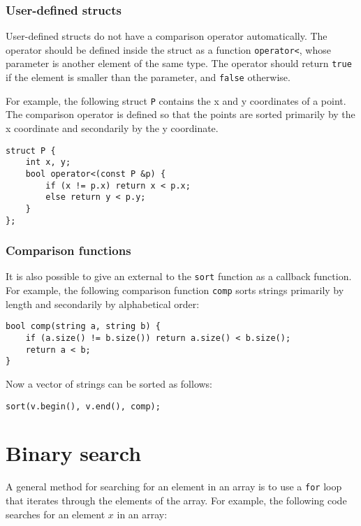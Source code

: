 \subsubsection{User-defined structs}

User-defined structs do not have a comparison
operator automatically.
The operator should be defined inside
the struct as a function
\texttt{operator<},
whose parameter is another element of the same type.
The operator should return \texttt{true}
if the element is smaller than the parameter,
and \texttt{false} otherwise.

For example, the following struct \texttt{P}
contains the x and y coordinates of a point.
The comparison operator is defined so that
the points are sorted primarily by the x coordinate
and secondarily by the y coordinate.

\begin{lstlisting}
struct P {
    int x, y;
    bool operator<(const P &p) {
        if (x != p.x) return x < p.x;
        else return y < p.y;
    }
};
\end{lstlisting}

\subsubsection{Comparison functions}


It is also possible to give an external
 to the \texttt{sort} function
as a callback function.
For example, the following comparison function \texttt{comp}
sorts strings primarily by length and secondarily
by alphabetical order:

\begin{lstlisting}
bool comp(string a, string b) {
    if (a.size() != b.size()) return a.size() < b.size();
    return a < b;
}
\end{lstlisting}
Now a vector of strings can be sorted as follows:
\begin{lstlisting}
sort(v.begin(), v.end(), comp);
\end{lstlisting}

\section{Binary search}


A general method for searching for an element
in an array is to use a \texttt{for} loop
that iterates through the elements of the array.
For example, the following code searches for
an element $x$ in an array:

